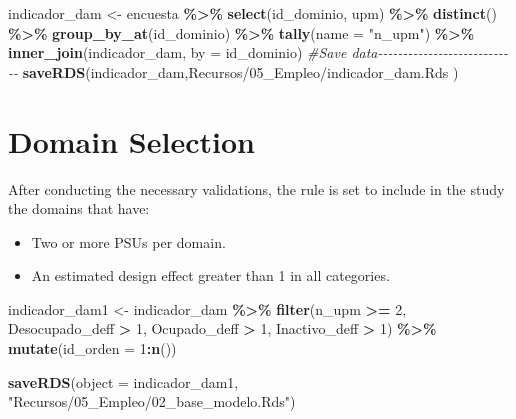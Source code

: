 \documentclass[
  12pt,
]{book}
\newenvironment{Shaded}{\begin{snugshade}}{\end{snugshade}}
\newcommand{\AttributeTok}[1]{\textcolor[rgb]{0.13,0.29,0.53}{#1}}
\newcommand{\CommentTok}[1]{\textcolor[rgb]{0.56,0.35,0.01}{\textit{#1}}}
\newcommand{\DecValTok}[1]{\textcolor[rgb]{0.00,0.00,0.81}{#1}}
\newcommand{\FunctionTok}[1]{\textcolor[rgb]{0.13,0.29,0.53}{\textbf{#1}}}
\newcommand{\NormalTok}[1]{#1}
\newcommand{\OtherTok}[1]{\textcolor[rgb]{0.56,0.35,0.01}{#1}}
\newcommand{\SpecialCharTok}[1]{\textcolor[rgb]{0.81,0.36,0.00}{\textbf{#1}}}
\newcommand{\StringTok}[1]{\textcolor[rgb]{0.31,0.60,0.02}{#1}}
\providecommand{\tightlist}{%
  \setlength{\itemsep}{0pt}\setlength{\parskip}{0pt}}
\begin{document}
\begin{Shaded}
\begin{Highlighting}[]
\NormalTok{indicador\_dam }\OtherTok{\textless{}{-}}\NormalTok{ encuesta }\SpecialCharTok{\%\textgreater{}\%} \FunctionTok{select}\NormalTok{(id\_dominio, upm) }\SpecialCharTok{\%\textgreater{}\%}
  \FunctionTok{distinct}\NormalTok{() }\SpecialCharTok{\%\textgreater{}\%} 
  \FunctionTok{group\_by\_at}\NormalTok{(id\_dominio) }\SpecialCharTok{\%\textgreater{}\%} 
  \FunctionTok{tally}\NormalTok{(}\AttributeTok{name =} \StringTok{"n\_upm"}\NormalTok{) }\SpecialCharTok{\%\textgreater{}\%} 
  \FunctionTok{inner\_join}\NormalTok{(indicador\_dam, }\AttributeTok{by =}\NormalTok{ id\_dominio)}
\CommentTok{\#Save data{-}{-}{-}{-}{-}{-}{-}{-}{-}{-}{-}{-}{-}{-}{-}{-}{-}{-}{-}{-}{-}{-}{-}{-}{-}{-}{-}{-}}
\FunctionTok{saveRDS}\NormalTok{(indicador\_dam,}\StringTok{\textquotesingle{}Recursos/05\_Empleo/indicador\_dam.Rds\textquotesingle{}}\NormalTok{ )}
\end{Highlighting}
\end{Shaded}

\hypertarget{domain-selection}{%
\section{Domain Selection}\label{domain-selection}}

After conducting the necessary validations, the rule is set to include in the study the domains that have:

\begin{itemize}
\tightlist
\item
  Two or more PSUs per domain.
\item
  An estimated design effect greater than 1 in all categories.
\end{itemize}

\begin{Shaded}
\begin{Highlighting}[]
\NormalTok{indicador\_dam1 }\OtherTok{\textless{}{-}}\NormalTok{ indicador\_dam }\SpecialCharTok{\%\textgreater{}\%}
  \FunctionTok{filter}\NormalTok{(n\_upm }\SpecialCharTok{\textgreater{}=} \DecValTok{2}\NormalTok{,}
\NormalTok{         Desocupado\_deff }\SpecialCharTok{\textgreater{}} \DecValTok{1}\NormalTok{,}
\NormalTok{         Ocupado\_deff }\SpecialCharTok{\textgreater{}} \DecValTok{1}\NormalTok{,}
\NormalTok{         Inactivo\_deff }\SpecialCharTok{\textgreater{}} \DecValTok{1}\NormalTok{)  }\SpecialCharTok{\%\textgreater{}\%}
  \FunctionTok{mutate}\NormalTok{(}\AttributeTok{id\_orden =} \DecValTok{1}\SpecialCharTok{:}\FunctionTok{n}\NormalTok{())}

\FunctionTok{saveRDS}\NormalTok{(}\AttributeTok{object =}\NormalTok{ indicador\_dam1, }\StringTok{"Recursos/05\_Empleo/02\_base\_modelo.Rds"}\NormalTok{)}
\end{Highlighting}
\end{Shaded}
\end{document}
